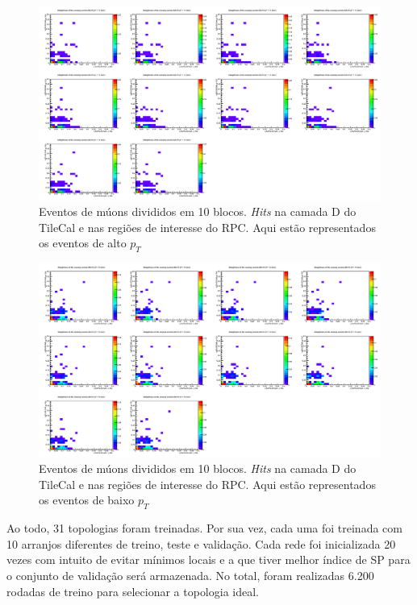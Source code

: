 \begin{figure}
    \centering
    \includegraphics[width=\textheight]{images/sglmuon/cluster_eta_phi_class.png}
    \caption{Eventos de múons divididos em 10 blocos. \emph{Hits} na camada D do
    TileCal e nas regiões de interesse do RPC. Aqui estão representados os
    eventos de alto $p_T$}
    \label{fig:bloco191715-2}
\end{figure}

\begin{figure}
    \centering
    \includegraphics[width=\textheight]{images/sglmuon/cluster_eta_phi_noclass.png}
    \caption{Eventos de múons divididos em 10 blocos. \emph{Hits} na camada D do
    TileCal e nas regiões de interesse do RPC. Aqui estão representados os
    eventos de baixo $p_T$}
    \label{fig:bloco191715-3}
\end{figure}

Ao todo, 31 topologias foram treinadas. Por sua vez, cada uma foi treinada com
10 arranjos diferentes de treino, teste e validação. Cada rede foi inicializada
20 vezes com intuito de evitar mínimos locais e a que tiver melhor índice de SP
para o conjunto de validação será armazenada. No total, foram realizadas 6.200
rodadas de treino para selecionar a topologia ideal. 


